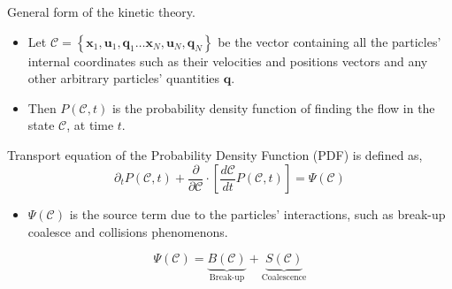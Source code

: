 \documentclass{sintefbeamer}
\newcommand{\pddt}{\partial_t}
\begin{document}
\begin{frame}{General form of the kinetic theory.}
  \begin{definition}
    \begin{itemize}
      \item Let $\mathscr{C} =\left\{\textbf{x}_1,\textbf{u}_1, \textbf{q}_1\ldots\textbf{x}_N,\textbf{u}_N, \textbf{q}_N\right\}$ be the vector containing all the particles' internal coordinates such as their velocities and positions vectors and any other arbitrary particles' quantities $\textbf{q}$. 
      \item Then $P(\mathscr{C},t)$ is the probability density function of finding the flow in the state $\mathscr{C}$, at time $t$. 
    \end{itemize}
  \end{definition}
  Transport equation of the Probability Density Function (PDF) is defined as,
  \begin{equation}
    \pddt P(\mathscr{C},t)
    + \frac{\partial}{\partial \mathscr{C}} \cdot
    \left[
        \frac{d\mathscr{C}}{dt}  
        P(\mathscr{C},t)
    \right]
    = \Psi(\mathscr{C})
    \label{eq:dt_P}
\end{equation}

  \begin{itemize}
    \item $\Psi(\mathscr{C})$ is the source term due to the particles' interactions, such as break-up coalesce and collisions phenomenons. 
  \end{itemize}
  \begin{equation*}
    \Psi(\mathscr{C}) =
    \underbrace{B(\mathscr{C})}_{\text{Break-up}}
    +\underbrace{S(\mathscr{C})}_{\text{Coalescence}}
  \end{equation*}
\end{frame}
\end{document}
